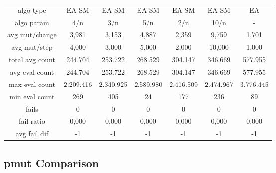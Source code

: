 \begin{tabular}[h]{ccccccc}
algo type&               EA-SM&        EA-SM&        EA-SM&        EA-SM&        EA-SM&           EA\\
algo param&                4/n&          3/n&          5/n&          2/n&         10/n&            -\\
avg mut/change&          3,981&        3,153&        4,887&        2,359&        9,759&        1,701\\
avg mut/step&            4,000&        3,000&        5,000&        2,000&       10,000&        1,000\\
\hline
total avg count&       244.704&      253.722&      268.529&      304.147&      346.669&      577.955\\
avg eval count&        244.704&      253.722&      268.529&      304.147&      346.669&      577.955\\
max eval count&      2.209.416&    2.340.925&    2.589.980&    2.416.509&    2.474.967&    3.776.445\\
min eval count&            269&          405&           24&          177&          236&           89\\
\hline
fails&                       0&            0&            0&            0&            0&            0\\
fail ratio&              0,000&        0,000&        0,000&        0,000&        0,000&        0,000\\
avg fail dif&               -1&           -1&           -1&           -1&           -1&           -1\\
\end{tabular}


\subsection{pmut Comparison}


